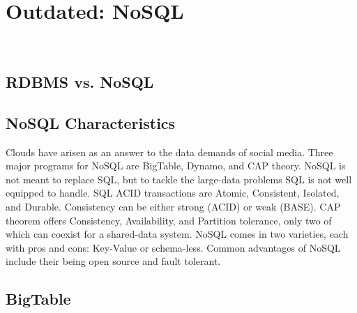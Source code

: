 \chapter{Outdated: NoSQL}
\label{sec:icloud-nosql}

\FILENAME\


\section{RDBMS vs. NoSQL}




\section{NoSQL Characteristics}

Clouds have arisen as an answer to the data demands of social media.
Three major programs for NoSQL are BigTable, Dynamo, and CAP theory.
NoSQL is not meant to replace SQL, but to tackle the large-data problems
SQL is not well equipped to handle. SQL ACID transactions are Atomic,
Consistent, Isolated, and Durable. Consistency can be either strong
(ACID) or weak (BASE). CAP theorem offers Consistency, Availability, and
Partition tolerance, only two of which can coexist for a shared-data
system. NoSQL comes in two varieties, each with pros and cons: Key-Value
or schema-less. Common advantages of NoSQL include their being open
source and fault tolerant.




\section{BigTable}

